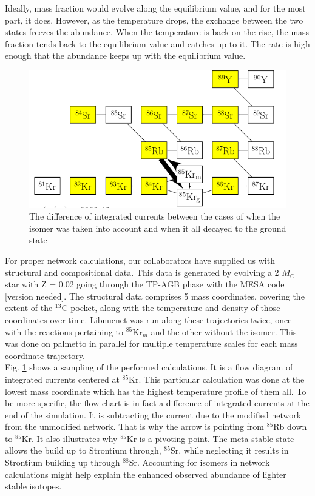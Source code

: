\documentclass{article}
\begin{document}
Ideally, mass fraction would evolve along the equilibrium value, and for the most part, it does. However, as the temperature drops, 
the exchange between the two states freezes the abundance. When the temperature is back on the rise, the mass fraction tends back to 
the equilibrium value and catches up to it. The rate is high enough that the abundance keeps up with the equilibrium value.\\

\begin{figure}[H]
    \centerline{\includegraphics[scale = 0.5]{images/sample_branch.png}}
    \caption{The difference of integrated currents between the cases of when the isomer was taken into account and when it all decayed to the ground state}
    \label{int_cur}
\end{figure}

For proper network calculations, our collaborators have supplied us with structural and compositional data. This data is generated 
by evolving a 2 $M_{\odot}$ star with Z = 0.02 going through the TP-AGB phase with the MESA code [version needed]\cite{paxton2010modules,paxton2013modules,paxton2015modules,paxton2018modules,paxton2019modules}.
The structural data comprises 5 mass coordinates, covering the extent of the $^{13}$C pocket, along with the temperature and density 
of those coordinates over time. Libnucnet was run along these trajectories twice, once with the reactions pertaining to $^{85}$Kr$_{m}$ 
and the other without the isomer. This was done on palmetto in parallel for multiple temperature scales for each mass 
coordinate trajectory.\\

Fig. \ref{int_cur} shows a sampling of the performed calculations. It is a flow diagram of integrated currents centered at $^{85}$Kr. 
This particular calculation was done at the lowest mass coordinate which has the highest temperature profile of them all. To be more 
specific, the flow chart is in fact a difference of integrated currents at the end of the simulation. It is subtracting the current 
due to the modified network from the unmodified network. That is why the arrow is pointing from $^{85}$Rb down to $^{85}$Kr. It 
also illustrates why $^{85}$Kr is a pivoting point. The meta-stable state allows the build up to Strontium through, $^{85}$Sr, while 
neglecting it results in Strontium building up through $^{88}$Sr. Accounting for isomers in network calculations might help explain 
the enhanced observed abundance of lighter stable isotopes.
\end{document}
